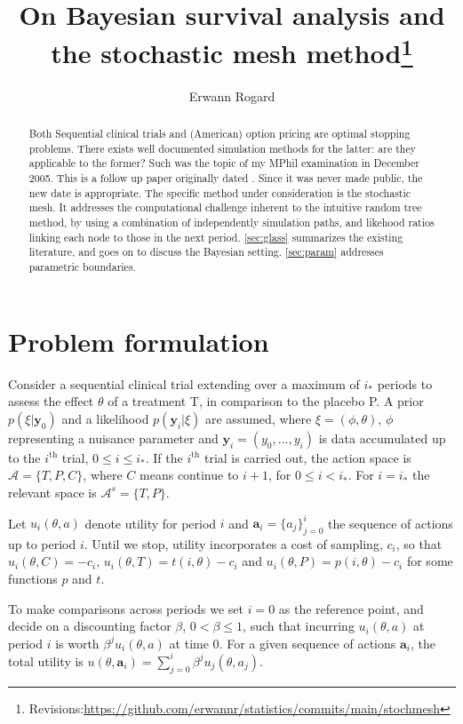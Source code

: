 \documentclass[11pt]{article}
\title{On Bayesian survival analysis and the stochastic mesh method\footnote{Revisions:\url{https://github.com/erwannr/statistics/commits/main/stochmesh}}}
\author{Erwann Rogard}
\date{\ThisDate}
\begin{document}
\maketitle

\begin{abstract}Both Sequential clinical trials and (American) option pricing are optimal stopping problems. There exists well documented simulation methods for the latter:  are they applicable to the former? Such was the topic of my MPhil examination in December 2005. This is a follow up paper originally dated \origDate. Since it was never made public, the new date is appropriate. The specific method under consideration is the stochastic mesh. It addresses the computational challenge inherent to the intuitive random tree method, by using a combination of independently simulation paths, and likehood ratios linking each node to those in the next period. \autoref{sec:glass} summarizes the existing literature, and goes on to discuss the Bayesian setting. \autoref{sec:param} addresses parametric boundaries.\end{abstract}

\section{Problem formulation}\label{sec:glass}
Consider a sequential clinical trial extending over a maximum of $i_*$ periods to assess the effect $\theta$ of a treatment T, in comparison to the placebo P. A prior
$\nonumber p(\xi|\mathbf{y}_0)$ and a likelihood $p(\mathbf{y}_i|\xi)$ are assumed, 
where $\xi=(\phi,\theta)$, $\phi$ representing a nuisance parameter and $\mathbf{y}_i=(y_0,...,y_i)$ is data accumulated up to the $i^{\mathrm{th}}$ trial, $0\leq i\leq i_*$. If the $i^{\mathrm{th}}$ trial is carried out, the action space is $\mathcal{A}=\{T,P,C\}$, where $C$ means continue to $i+1$, for $0\leq i<i_*$. For $i=i_*$ the relevant space is $\mathcal{A}^{s}=\{T,P\}$.

Let $u_i(\theta,a)$ denote utility for period $i$ and $\mathbf{a}_i=\{a_j\}_{j=0}^i$ the sequence of actions up to period $i$. Until we stop, utility incorporates a cost of sampling, $c_i$, so that $u_i(\theta,C)=-c_i$, $u_i(\theta,T)=t(i,\theta)-c_i$ and $u_i(\theta,P)=p(i,\theta)-c_i$ for some functions $p$ and $t$. 

To make comparisons across periods we set $i=0$ as the reference point, and decide on a discounting factor $\beta$, $0<\beta\leq 1$, such that incurring $u_i(\theta,a)$ at period $i$ is worth $\beta^ j u_i(\theta,a)$ at time $0$. For a given sequence of actions $\mathbf{a}_i$, the total utility is $u(\theta,\mathbf{a}_i)=\sum_{j=0}^i \beta^j u_j(\theta,a_j)$.
\end{document}
